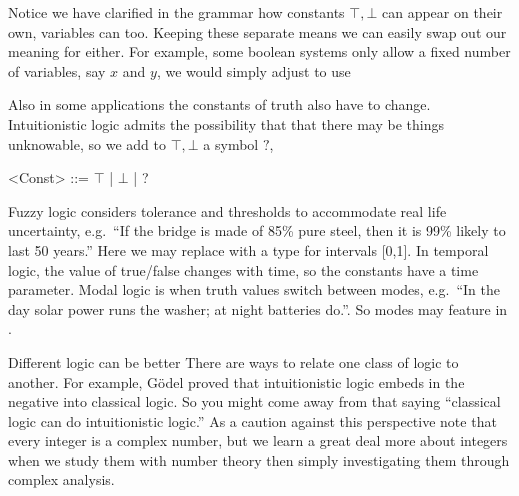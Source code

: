 Notice we have clarified in the grammar how 
constants $\top,\bot$ can appear on their own, variables can too.  
Keeping these separate means we can easily swap out our meaning for either.
For example, some boolean systems only allow a fixed number of variables, say 
$x$ and $y$, we would simply adjust to use 
\begin{center}
\end{center}
Also in some applications the constants of truth also have to change.
Intuitionistic logic admits the possibility that that there may be 
things unknowable, so we add to $\top,\bot$ a symbol $?$,
\begin{center}
\begin{Gcode}[]
<Const> ::= $\top$ | $\bot$ | ?
\end{Gcode}
\end{center}
Fuzzy logic considers tolerance and thresholds to accommodate real life uncertainty, 
e.g.\ ``If the bridge is made of 85\% pure steel, then it is 99\% likely to last 50 years.''
Here we may replace  with a type for intervals [0,1].
In temporal logic, the value of true/false changes with time, so the 
constants have a time parameter.  Modal logic is when truth values 
switch between modes, e.g.\ ``In the day solar power runs the washer; at night 
batteries do.''.  So modes may feature in .


\begin{remark}{Different logic can be better}
    There are ways to relate one class of logic to another. 
    For example, G\"odel proved that intuitionistic logic embeds
    in the negative into classical logic.  So you 
    might come away from that saying ``classical logic can do 
    intuitionistic logic.''   As a caution against this perspective note that every integer is 
    a complex number, but we learn a great deal more about integers when we 
    study them with number theory then simply investigating them 
    through complex analysis. 
\end{remark}


